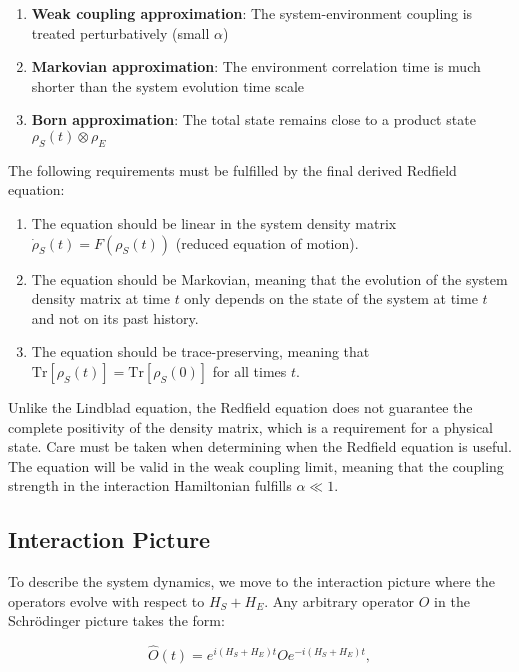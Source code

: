 \begin{enumerate}
	\item \textbf{Weak coupling approximation}: The system-environment coupling is treated perturbatively (small $\alpha$)
	\item \textbf{Markovian approximation}: The environment correlation time is much shorter than the system evolution time scale
	\item \textbf{Born approximation}: The total state remains close to a product state $\rho_S(t) \otimes \rho_E$
\end{enumerate}

The following requirements must be fulfilled by the final derived Redfield equation:

\begin{enumerate}
	\item The equation should be linear in the system density matrix $\dot{\rho}_S(t) = F(\rho_S(t))$ (reduced equation of motion).
	\item The equation should be Markovian, meaning that the evolution of the system density matrix at time $t$ only depends on the state of the system at time $t$ and not on its past history.
	\item The equation should be trace-preserving, meaning that $\mathrm{Tr}[\rho_S(t)] = \mathrm{Tr}[\rho_S(0)]$ for all times $t$.
\end{enumerate}

Unlike the Lindblad equation, the Redfield equation does not guarantee the complete positivity of the density matrix, which is a requirement for a physical state. Care must be taken when determining when the Redfield equation is useful. The equation will be valid in the weak coupling limit, meaning that the coupling strength in the interaction Hamiltonian fulfills $\alpha \ll 1$.

\subsection{Interaction Picture}

To describe the system dynamics, we move to the interaction picture where the operators evolve with respect to $H_S + H_E$. Any arbitrary operator $O$ in the Schrödinger picture takes the form:

\begin{equation}
	\hat{O}(t) = e^{i(H_S+H_E)t} O e^{-i(H_S+H_E)t},
	\label{eq:Interaction_Picture_Operators}
\end{equation}

